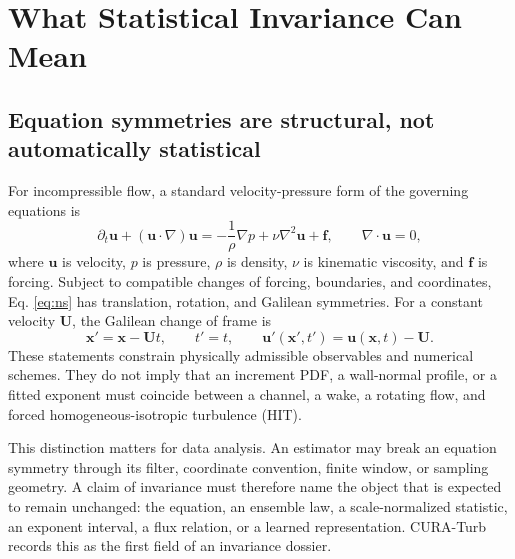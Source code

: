 \documentclass[conference]{../../../../Conference-LaTeX-template_10-17-19/IEEEtran}
\begin{document}
\section{What Statistical Invariance Can Mean}
\subsection{Equation symmetries are structural, not automatically statistical}
For incompressible flow, a standard velocity-pressure form of the governing equations is
\begin{equation}
\partial_t\mathbf{u}+(\mathbf{u}\cdot\nabla)\mathbf{u}=-\frac{1}{\rho}\nabla p+\nu\nabla^2\mathbf{u}+\mathbf{f},\qquad \nabla\cdot\mathbf{u}=0,
\label{eq:ns}
\end{equation}
where $\mathbf{u}$ is velocity, $p$ is pressure, $\rho$ is density, $\nu$ is kinematic viscosity, and $\mathbf{f}$ is forcing. Subject to compatible changes of forcing, boundaries, and coordinates, Eq. \eqref{eq:ns} has translation, rotation, and Galilean symmetries. For a constant velocity $\mathbf{U}$, the Galilean change of frame is
\begin{equation}
\mathbf{x}'=\mathbf{x}-\mathbf{U}t,\qquad t'=t,\qquad \mathbf{u}'(\mathbf{x}',t')=\mathbf{u}(\mathbf{x},t)-\mathbf{U}.
\label{eq:galilean}
\end{equation}
These statements constrain physically admissible observables and numerical schemes. They do not imply that an increment PDF, a wall-normal profile, or a fitted exponent must coincide between a channel, a wake, a rotating flow, and forced homogeneous-isotropic turbulence (HIT).

This distinction matters for data analysis. An estimator may break an equation symmetry through its filter, coordinate convention, finite window, or sampling geometry. A claim of invariance must therefore name the object that is expected to remain unchanged: the equation, an ensemble law, a scale-normalized statistic, an exponent interval, a flux relation, or a learned representation. CURA-Turb records this as the first field of an invariance dossier.
\end{document}
